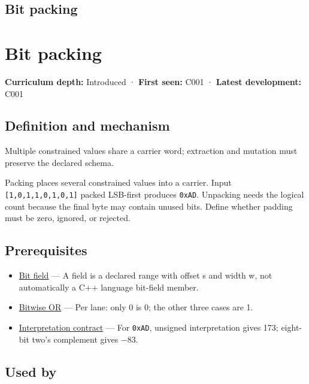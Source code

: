 \hypertarget{appendix-1f9963e1a5d1}{}
\section*{Bit packing}
\chapter{Bit packing}\label{appendix-1f9963e1a5d1-bit-packing}

\textbf{Curriculum depth:} Introduced · \textbf{First seen:} C001 · \textbf{Latest development:} C001

\section{Definition and mechanism}\label{appendix-1f9963e1a5d1-definition-and-mechanism}

Multiple constrained values share a carrier word; extraction and mutation must preserve the declared schema.

Packing places several constrained values into a carrier. Input \texttt{{[}1,0,1,1,0,1,0,1{]}} packed LSB-first produces \texttt{0xAD}. Unpacking needs the logical count because the final byte may contain unused bits. Define whether padding must be zero, ignored, or rejected.

\section{Prerequisites}\label{appendix-1f9963e1a5d1-prerequisites}

\begin{itemize}
\tightlist
\item
  \hyperref[appendix-ac697f5c66e8]{Bit field} --- A field is a declared range with offset s and width w, not automatically a C++ language bit-field member.
\item
  \hyperref[appendix-a427ce8ce8a6]{Bitwise OR} --- Per lane: only 0 is 0; the other three cases are 1.
\item
  \hyperref[appendix-f414bd4ed05c]{Interpretation contract} --- For \texttt{0xAD}, unsigned interpretation gives 173; eight-bit two's complement gives −83.
\end{itemize}

\section{Used by}\label{appendix-1f9963e1a5d1-used-by}

